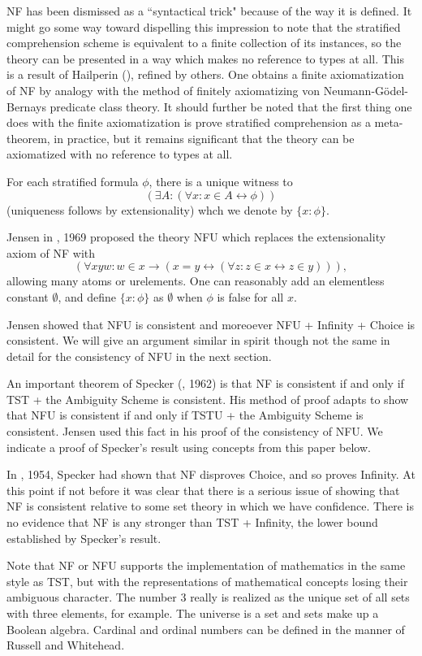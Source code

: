 \documentclass[112pt]{article}
\begin{document}
NF has been dismissed as a ``syntactical trick" because of the way it is defined.  It might go some way toward dispelling this impression to note that the stratified comprehension scheme is equivalent to a finite collection of its instances, so the theory can be presented in a way which makes no reference to types at all.  This is a result of Hailperin (\cite{hailperin}), refined by others.  One obtains a finite axiomatization of NF by analogy with the method of finitely axiomatizing von Neumann-G\"odel-Bernays predicate class theory.  It should further be noted that the first thing one does with the finite axiomatization is prove stratified comprehension as a meta-theorem, in practice, but it remains significant that the theory can be axiomatized with no reference to types at all.

For each stratified formula $\phi$, there is a unique witness to $$(\exists A:(\forall x:x \in A \leftrightarrow \phi))$$ (uniqueness follows by extensionality) whch we denote by $\{x:\phi\}$.

Jensen in \cite{nfu}, 1969 proposed the theory NFU which replaces the extensionality axiom of NF with $$(\forall xyw:w \in x \rightarrow (x=y \leftrightarrow (\forall z:z \in x \leftrightarrow z\in y))),$$  allowing many atoms or urelements.  One can reasonably add an elementless constant $\emptyset$, and define $\{x:\phi\}$ as $\emptyset$ when $\phi$ is false for all $x$.

Jensen showed that NFU is consistent and moreoever NFU + Infinity + Choice is consistent.  We will give an argument similar in spirit though not the same in detail for the consistency of NFU in the next section.

An important theorem of Specker (\cite{ambiguity}, 1962) is that NF is consistent if and only if TST + the Ambiguity Scheme is consistent.  His method of proof adapts to show that  NFU is consistent if and only if TSTU + the Ambiguity Scheme is consistent.  Jensen used this fact in his proof of the consistency of NFU.  We indicate a proof of Specker's result using concepts from this paper below.

In \cite{notac}, 1954, Specker had shown that NF disproves Choice, and so proves Infinity.  At this point if not before it was clear that there is a serious issue of showing that NF is consistent relative to some set theory in which we have confidence.  There is no evidence that NF is any stronger than TST + Infinity, the lower bound established by Specker's result.

Note that NF or NFU supports the implementation of mathematics in the same style as TST, but with the representations of mathematical concepts losing their ambiguous character.  The number 3 really is realized as the unique set of all sets with three elements, for example.  The universe is a set and sets make up a Boolean algebra.   Cardinal and ordinal numbers can be defined
in the manner of Russell and Whitehead.
\end{document}

